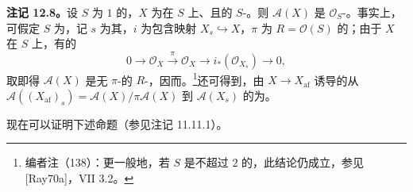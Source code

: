 \textbf{注记 12.8。}设 $S$ 为 $1$ 的，$X$ 为在 $S$ 上、且的 $S$-。则 $\mathscr A(X)$ 是 $\mathcal O_S$-。事实上，可假定 $S$ 为，记 $s$ 为其，$i$ 为包含映射 $X_s\hookrightarrow X$，$\pi$ 为 $R=\mathcal O(S)$ 的；由于 $X$ 在 $S$ 上，有的
\[
0\longrightarrow\mathcal O_X\xrightarrow{\pi}\mathcal O_X\longrightarrow i_*(\mathcal O_{X_s})\longrightarrow0,
\]
取即得 $\mathscr A(X)$ 是无 $\pi$-的 $R$-，因而。\footnote{编者注（138）：更一般地，若 $S$ 是不超过 $2$ 的，此结论仍成立，参见 [Ray70a]，VII 3.2。}还可得到，由 $X\to X_{\mathrm{af}}$ 诱导的从 $\mathscr A((X_{\mathrm{af}})_s)=\mathscr A(X)/\pi\mathscr A(X)$ 到 $\mathscr A(X_s)$ 的为。

现在可以证明下述命题（参见注记 11.11.1）。

